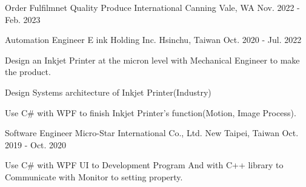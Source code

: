 

\begin{cventries}

  \cventry
    {Order Fulfilmnet} %
    {Quality Produce International} %
    {Canning Vale, WA} %
    {Nov. 2022 - Feb. 2023} %
    {
      \begin{cvitems} %
      \end{cvitems}
    }

  \cventry
    {Automation Engineer} %
    {E ink Holding Inc.} %
    {Hsinchu, Taiwan} %
    {Oct. 2020 - Jul. 2022} %
    {
      \begin{cvitems} %
        \item {Design an Inkjet Printer at the micron level with Mechanical Engineer to make the product.}
        \item {Design Systems architecture of Inkjet Printer(Industry)}
        \item {Use C\# with WPF to finish Inkjet Printer's function(Motion, Image Process).}
      \end{cvitems}
    }

  \cventry
    {Software Engineer} %
    {Micro-Star International Co., Ltd.} %
    {New Taipei, Taiwan} %
    {Oct. 2019 - Oct. 2020} %
    {
      \begin{cvitems} %
        \item {Use C\# with WPF UI to Development Program And with C++ library to Communicate with Monitor to setting property.}
      \end{cvitems}
    }
    

\end{cventries}
